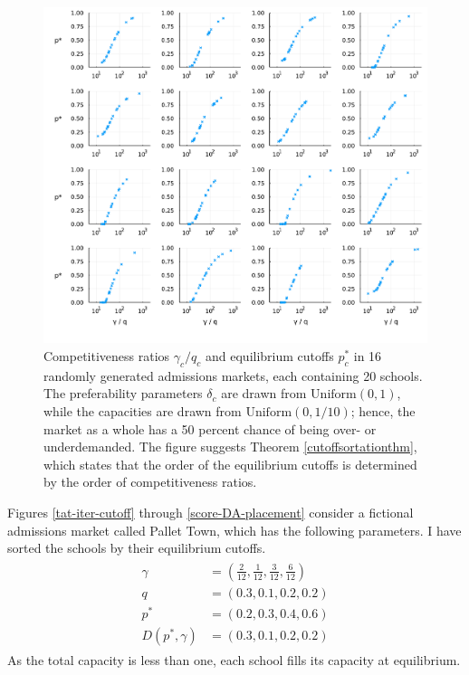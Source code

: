 \documentclass[12pt]{article}
\numberwithin{equation}{subsection}
\theoremstyle{definition}
\begin{document}
\begin{figure}
\begin{center}\includegraphics[width=\linewidth, ]{plots/gammaq-pstar.pdf}\end{center}
\captionsetup{singlelinecheck=off}
    \caption[.]{Competitiveness ratios $\gamma_c / q_c$ and equilibrium cutoffs $p_c^*$ in 16 randomly generated admissions markets, each containing 20 schools. The preferability parameters $\delta_c$ are drawn from $\operatorname{Uniform(0, 1)}$, while the capacities are drawn from $\operatorname{Uniform(0, 1/10)}$; hence, the market as a whole has a 50 percent chance of being over- or underdemanded. The figure suggests Theorem \ref{cutoffsortationthm}, which states that the order of the equilibrium cutoffs is determined by the order of competitiveness ratios.}
\label{gammaq-pstar}
\end{figure}

Figures \ref{tat-iter-cutoff} through \ref{score-DA-placement} consider a fictional admissions market called Pallet Town, which has the following parameters. I have sorted the schools by their equilibrium cutoffs.
\begin{gather} \label{pallettowndef}
\begin{aligned}
\gamma &=  \textstyle{\left(\frac{2}{12}, \frac{1}{12}, \frac{3}{12}, \frac{6}{12}\right)}\\
q &= (0.3, 0.1, 0.2, 0.2) \\
p^* &= (0.2, 0.3, 0.4, 0.6)\\
D(p^*, \gamma) &=  (0.3, 0.1, 0.2, 0.2)
\end{aligned}
\end{gather}
As the total capacity is less than one, each school fills its capacity at equilibrium.
\end{document}

